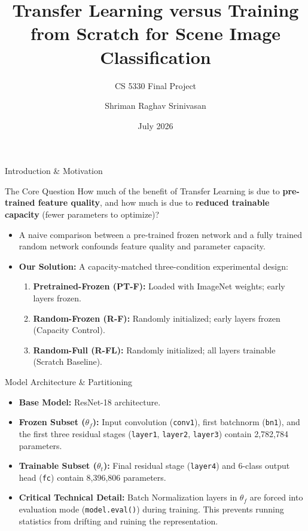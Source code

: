 \documentclass[aspectratio=169]{beamer}
\title[Transfer Learning vs. Scratch]{Transfer Learning versus Training from Scratch for Scene Image Classification}
\subtitle{CS 5330 Final Project}
\author{Shriman Raghav Srinivasan}
\institute[Northeastern]{Khoury College of Computer Sciences \\ Northeastern University}
\date{July 2026}
\begin{document}
\begin{frame}
  \titlepage
\end{frame}

\begin{frame}{Introduction \& Motivation}
  \begin{block}{The Core Question}
    How much of the benefit of Transfer Learning is due to \textbf{pre-trained feature quality}, and how much is due to \textbf{reduced trainable capacity} (fewer parameters to optimize)?
  \end{block}
  \begin{itemize}
    \item A naive comparison between a pre-trained frozen network and a fully trained random network confounds feature quality and parameter capacity.
    \item \textbf{Our Solution:} A capacity-matched three-condition experimental design:
      \begin{enumerate}
        \item \textbf{Pretrained-Frozen (PT-F):} Loaded with ImageNet weights; early layers frozen.
        \item \textbf{Random-Frozen (R-F):} Randomly initialized; early layers frozen (Capacity Control).
        \item \textbf{Random-Full (R-FL):} Randomly initialized; all layers trainable (Scratch Baseline).
      \end{enumerate}
  \end{itemize}
\end{frame}

\begin{frame}{Model Architecture \& Partitioning}
  \begin{itemize}
    \item \textbf{Base Model:} ResNet-18 architecture.
    \item \textbf{Frozen Subset ($\theta_f$):} Input convolution (\texttt{conv1}), first batchnorm (\texttt{bn1}), and the first three residual stages (\texttt{layer1}, \texttt{layer2}, \texttt{layer3}) contain 2,782,784 parameters.
    \item \textbf{Trainable Subset ($\theta_t$):} Final residual stage (\texttt{layer4}) and 6-class output head (\texttt{fc}) contain 8,396,806 parameters.
    \item \textbf{Critical Technical Detail:} Batch Normalization layers in $\theta_f$ are forced into evaluation mode (\texttt{model.eval()}) during training. This prevents running statistics from drifting and ruining the representation.
  \end{itemize}
\end{frame}
\end{document}

